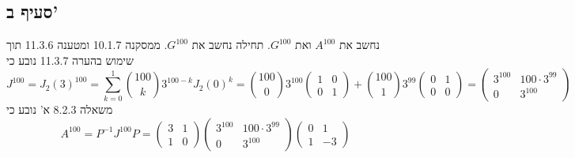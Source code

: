 \subsection{סעיף ב'}
נחשב את $A^{100}$ ואת $G^{100}$.
תחילה נחשב את $G^{100}$. ממסקנה 10.1.7 ומטענה 11.3.6 תוך שימוש בהערה 11.3.7 נובע כי
\[
	J^{100} = {J_2 (3)}^{100} = \sum_{k = 0}^1 \binom{100}{k} 3^{100 - k} {J_2(0)}^k
	= \binom{100}{0} 3^{100} \begin{pmatrix}
		1 & 0 \\
		0 & 1
	\end{pmatrix}
	+ \binom{100}{1} 3^{99} \begin{pmatrix}
		0 & 1 \\
		0 & 0
	\end{pmatrix}
	= \begin{pmatrix}
		3^{100} & 100 \cdot 3^{99} \\
		0 & 3^{100}
	\end{pmatrix}
\]
משאלה 8.2.3 א' נובע כי
\[
	A^{100} = P^{-1} J^{100} P
	= \begin{pmatrix}
		3 & 1 \\
		1 & 0
	\end{pmatrix}
	\begin{pmatrix}
		3^{100} & 100 \cdot 3^{99} \\
		0 & 3^{100}
	\end{pmatrix}
	\begin{pmatrix}
		0 & 1 \\
		1 & -3
	\end{pmatrix}
\]

